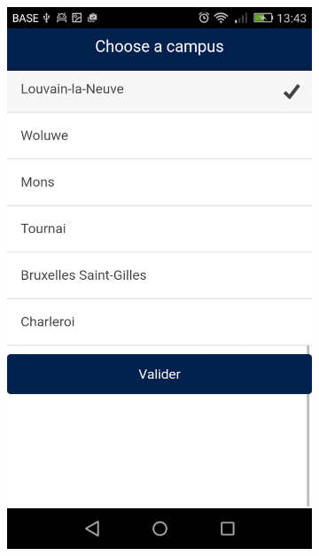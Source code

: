 \documentclass{eplmastersthesis}
\begin{document}
\begin{figure}
\begin{subfigure}[b]{0.3\textwidth}
        \includegraphics[width=\textwidth]{Images/Application_screens/Screenshot_2016-06-06-13-43-14.png}
    \end{subfigure}
    ~ %
    \begin{subfigure}[b]{0.3\textwidth}

\end{subfigure}
\end{figure}
\end{document}
